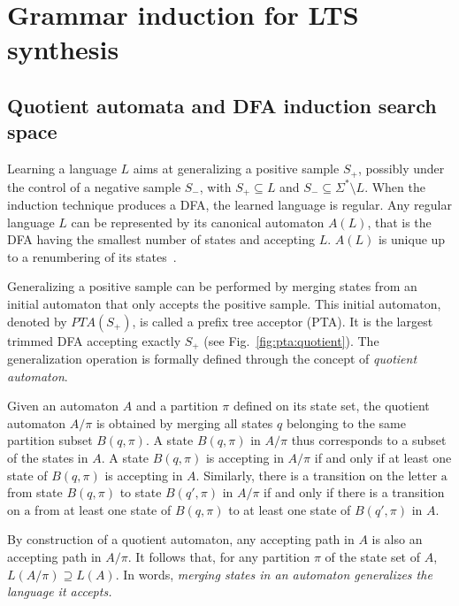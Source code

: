 \section{Grammar induction for LTS synthesis\label{section:inductive-background}}

\subsection{Quotient automata and DFA induction search space}

Learning a language $L$ aims at generalizing a positive sample $S_+$, possibly under the control of a negative sample $S_-$, with $S_+ \subseteq L$ and $S_- \subseteq \Sigma^*\setminus L$. When the induction technique produces a DFA, the learned language is regular. Any regular language $L$ can be represented by its canonical automaton $A(L)$, that is the DFA having the smallest number of states and accepting $L$. $A(L)$ is unique up to a renumbering of its states~\cite{Hopcroft:1979}.

Generalizing a positive sample can be performed by merging states from an initial automaton that only accepts the positive sample.  This initial automaton, denoted by $PTA(S_+)$, is called a prefix tree acceptor (PTA). It is the largest trimmed DFA accepting exactly $S_+$ (see Fig.~\ref{fig:pta:quotient}). The generalization operation is formally defined through the concept of \emph{quotient automaton}.

\begin{definition}
Given an automaton $A$ and a partition $\pi$ defined on its state set, the quotient automaton $A/\pi$ is obtained
by merging all states $q$ belonging to the same partition subset $B(q,\pi)$. A state $B(q,\pi)$ in $A/\pi$ thus 
corresponds to a subset of the states in $A$. 
A state $B(q,\pi)$ is accepting in $A/\pi$ if and only if
at least one state of $B(q,\pi)$ is accepting in $A$. Similarly, there is a transition on the letter $\mathrm{a}$ from state $B(q,\pi)$ to state $B(q',\pi)$ in $A/\pi$ if and only if there is a transition on $\mathrm{a}$ from at least one state of $B(q,\pi)$ to at least one state of $B(q',\pi)$ in $A$. 
\end{definition}

By construction of a quotient automaton, any accepting path in $A$ is also an accepting path in $A/\pi$. It follows that, for any partition $\pi$ of the state set of $A$, $L(A/\pi) \supseteq L(A)$. In words, \textsl{merging states in an automaton generalizes the language it accepts.}
 
